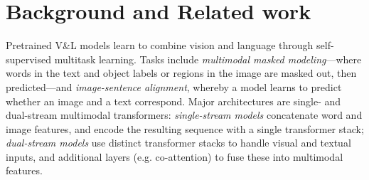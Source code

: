 \documentclass[11pt]{article}
\begin{document}
\section{Background and Related work}\label{sec:related_work}

Pretrained V\&L models learn to combine vision and language through self-supervised multitask learning. Tasks include \textit{multimodal masked modeling}---where words in the text and object labels or regions in the image are masked out, then predicted---and \textit{image-sentence alignment}, whereby a model learns to predict whether an image and a text correspond. 
Major architectures are single- and dual-stream multimodal transformers: \textit{single-stream models}
concatenate word and image features, and encode the resulting sequence with a single transformer stack;
\textit{dual-stream models}
use distinct transformer stacks to handle visual and textual inputs, and additional layers (e.g. co-attention) to fuse these into multimodal features.
\end{document}
